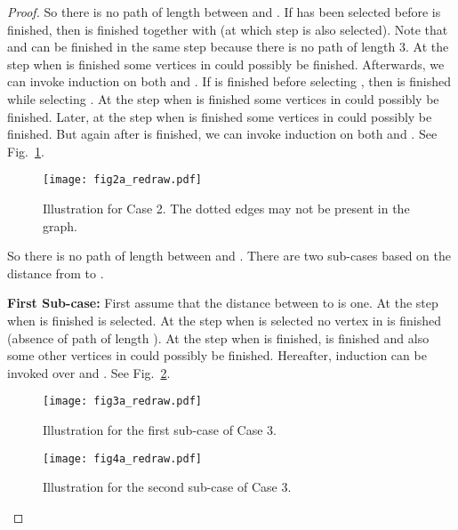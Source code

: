 \documentclass[11pt]{article}
\newcommand{\FI}[1]{Fig.\ \ref{#1}}
\begin{document}
\begin{proof}
 So there is no path of length  between  and . If  has been selected before  is finished, then  is finished together with  (at which step  is also selected). Note that  and  can be finished in the same step because there is no path of length 3. At the step when  is finished some vertices in  could possibly be finished. Afterwards,  we can invoke induction on both  and . If  is finished before selecting , then  is finished while selecting . At the step when  is finished some vertices in  could possibly be finished. Later, at the step when  is finished some vertices in  could possibly be finished. But again after  is finished, we can invoke induction on both  and .  See \FI{fig:serpar1}.


\begin{figure}[h]
\begin{center}
\texttt{[image: fig2a\_redraw.pdf]}
\vspace*{-.1in}
\caption{Illustration for Case 2. The dotted edges may not be present in the graph.}
\label{fig:serpar1}
\end{center}
\end{figure} 


  So there is no path of length  between  and . There are two sub-cases based on the distance from  to . 

\noindent\textbf{First Sub-case:} First assume that the distance between  to  is one. At the step when  is finished  is selected. At the step when  is selected no vertex in  is finished (absence of path of length ). At the step when  is finished,  is  finished and also some other vertices in  could possibly be finished. Hereafter, induction can be invoked over  and .  See \FI{fig:serpar2}.

\begin{figure}[h]
\begin{center}
\texttt{[image: fig3a\_redraw.pdf]}
\vspace*{-.1in}
\caption{Illustration for the first sub-case of Case 3.}
\label{fig:serpar2}
\end{center}
\end{figure} 



\begin{figure}[h]
\begin{center}
\texttt{[image: fig4a\_redraw.pdf]}
\vspace*{-.1in}
\caption{Illustration for the second sub-case of Case 3.}
\label{fig:serpar3}
\end{center}
\end{figure} 





\end{proof}
\end{document}
